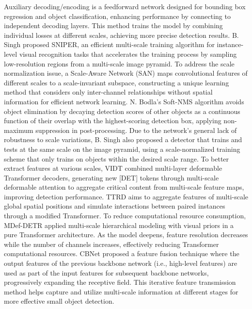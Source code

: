 \documentclass[journal]{IEEEtran}
\begin{document}
Auxiliary decoding/encoding is a feedforward network designed for bounding box regression and object classification, enhancing performance by connecting to independent decoding layers. This method trains the model by combining individual losses at different scales, achieving more precise detection results. B. Singh proposed SNIPER\cite{singh2018sniper}, an efficient multi-scale training algorithm for instance-level visual recognition tasks that accelerates the training process by sampling low-resolution regions from a multi-scale image pyramid. To address the scale normalization issue, a Scale-Aware Network (SAN)\cite{kim2018san} maps convolutional features of different scales to a scale-invariant subspace, constructing a unique learning method that considers only inter-channel relationships without spatial information for efficient network learning. N. Bodla's Soft-NMS algorithm\cite{bodla2017soft} avoids object elimination by decaying detection scores of other objects as a continuous function of their overlap with the highest-scoring detection box, applying non-maximum suppression in post-processing. Due to the network's general lack of robustness to scale variations, B. Singh also proposed a detector that trains and tests at the same scale on the image pyramid\cite{singh2018analysis}, using a scale-normalized training scheme that only trains on objects within the desired scale range. To better extract features at various scales, VIDT\cite{song2021vidt} combined multi-layer deformable Transformer decoders, generating new [DET] tokens through multi-scale deformable attention to aggregate critical content from multi-scale feature maps, improving detection performance. TTRD\cite{li2022transformer} aims to aggregate features of multi-scale global spatial positions and simulate interactions between paired instances through a modified Transformer. To reduce computational resource consumption, MDef-DETR\cite{maaz2021multi} applied multi-scale hierarchical modeling with visual priors in a pure Transformer architecture. As the model deepens, feature resolution decreases while the number of channels increases, effectively reducing Transformer computational resources. CBNet\cite{liang2022cbnet} proposed a feature fusion technique where the output features of the previous backbone network (i.e., high-level features) are used as part of the input features for subsequent backbone networks, progressively expanding the receptive field. This iterative feature transmission method helps capture and utilize multi-scale information at different stages for more effective small object detection.
\end{document}

